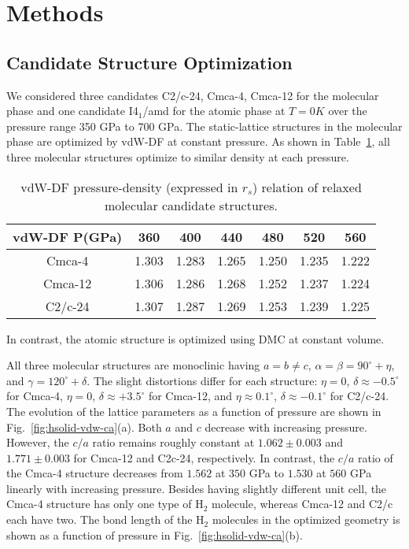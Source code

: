 \section{Methods}
\label{sec:hsolid-methods}

\subsection{Candidate Structure Optimization}
We considered three candidates C2/c-24, Cmca-4, Cmca-12 for the molecular phase and one candidate I4$_1$/amd for the atomic phase at $T=0K$ over the pressure range 350 GPa to 700 GPa. The static-lattice structures in the molecular phase are optimized by vdW-DF at constant pressure.
As shown in Table~\ref{tab:hsolid-mol-press-rs}, all three molecular structures optimize to similar density at each pressure.
\begin{table}[h]
\centering
\begin{tabular}{ccccccc}
\toprule
vdW-DF P(GPa) & 360 & 400 & 440 & 480 & 520 & 560 \\
\midrule
Cmca-4  & 1.303 & 1.283 & 1.265 & 1.250 & 1.235 & 1.222 \\
Cmca-12 & 1.306 & 1.286 & 1.268 & 1.252 & 1.237 & 1.224 \\
C2/c-24 & 1.307 & 1.287 & 1.269 & 1.253 & 1.239 & 1.225 \\
\bottomrule
\end{tabular}
\caption{vdW-DF pressure-density (expressed in $r_s$) relation of relaxed molecular candidate structures.}
\label{tab:hsolid-mol-press-rs}
\end{table}
In contrast, the atomic structure is optimized using DMC at constant volume.

All three molecular structures are monoclinic having $a=b\neq c$, $\alpha=\beta=90^\circ+\eta$, and $\gamma=120^\circ+\delta$. The slight distortions differ for each structure: $\eta=0$, $\delta\approx -0.5^\circ$ for Cmca-4, $\eta=0$, $\delta\approx+3.5^\circ$ for Cmca-12, and $\eta\approx0.1^\circ$, $\delta\approx-0.1^\circ$ for C2/c-24.
The evolution of the lattice parameters as a function of pressure are shown in Fig.~\ref{fig:hsolid-vdw-ca}(a).
Both $a$ and $c$ decrease with increasing pressure.
However, the $c/a$ ratio remains roughly constant at $1.062\pm0.003$ and $1.771\pm0.003$ for Cmca-12 and C2c-24, respectively.
In contrast, the $c/a$ ratio of the Cmca-4 structure decreases from $1.562$ at $350$ GPa to $1.530$ at $560$ GPa linearly with increasing pressure.
Besides having slightly different unit cell, the Cmca-4 structure has only one type of H$_2$ molecule, whereas Cmca-12 and C2/c each have two.
The bond length of the H$_2$ molecules in the optimized geometry is shown as a function of pressure in Fig.~\ref{fig:hsolid-vdw-ca}(b).

